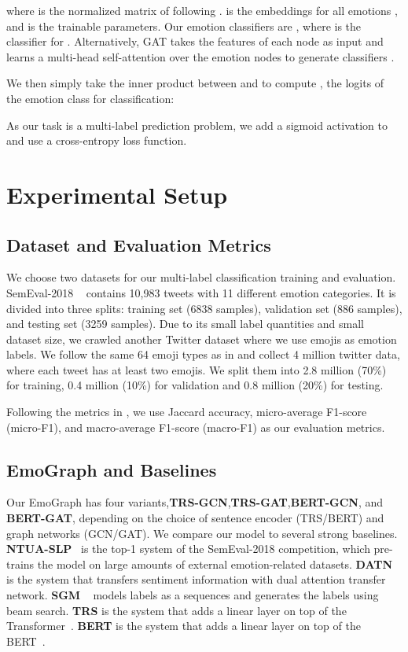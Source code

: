 \documentclass[11pt,a4paper]{article}
\begin{document}
where  is the normalized matrix of  following \citet{kipf2016semi}.  is the embeddings for all emotions , and  is the trainable parameters. Our emotion classifiers are , where  is the classifier for . Alternatively, GAT takes the features of each node as input and learns a multi-head self-attention over the emotion nodes to generate classifiers .


We then simply take the inner product between  and  to compute , the logits of the emotion class  for classification:

As our task is a multi-label prediction problem, we add a sigmoid activation to   and use a cross-entropy loss function.





\section{Experimental Setup}
\subsection{Dataset and Evaluation Metrics}
We choose two datasets for our multi-label classification training and evaluation. SemEval-2018 ~\cite{mohammad2018semeval} contains 10,983 tweets with 11 different emotion categories. It is divided into three splits: training set (6838 samples), validation set (886 samples), and testing set (3259 samples). Due to its small label quantities and small dataset size, we crawled another Twitter dataset where we use emojis as emotion labels. We follow the same 64 emoji types as in \citet{felbo2017using} and collect 4 million twitter data, where each tweet has at least two emojis. We split them into 2.8 million (70\%) for training, 0.4 million (10\%) for validation and 0.8 million (20\%) for testing. 


Following the metrics in \citet{mohammad2018semeval}, we use Jaccard accuracy, micro-average F1-score (micro-F1), and macro-average F1-score (macro-F1) as our evaluation metrics.  






\subsection{EmoGraph and Baselines}
Our EmoGraph has four variants,\textbf{TRS-GCN},\textbf{TRS-GAT},\textbf{BERT-GCN}, and \textbf{BERT-GAT}, depending on the choice of sentence encoder (TRS/BERT) and graph networks (GCN/GAT). We compare our model to several strong baselines. \textbf{NTUA-SLP}~\cite{baziotis2018ntua} is the top-1 system of the SemEval-2018 competition, which pre-trains the model on large amounts of external emotion-related datasets. \textbf{DATN} ~\cite{yu2018improving} is the system that transfers sentiment information with dual attention transfer network.
\textbf{SGM} ~\cite{yang2018sgm} models labels as a sequences and generates the labels using beam search. \textbf{TRS} is the system that adds a linear layer on top of the Transformer~\cite{vaswani2017attention}. \textbf{BERT} is the  system that adds a linear layer on top of the BERT~\cite{devlin2019bert}.
\end{document}
